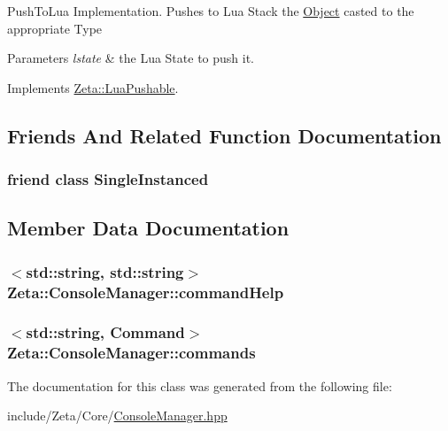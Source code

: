 Push\+To\+Lua Implementation. Pushes to Lua Stack the \hyperlink{classZeta_1_1Object}{Object} casted to the appropriate Type 
\begin{DoxyParams}{Parameters}
{\em lstate} & the Lua State to push it. \\
\hline
\end{DoxyParams}


Implements \hyperlink{classZeta_1_1LuaPushable_a0380ec9cff11f749e8eb67b51b8f82fc}{Zeta\+::\+Lua\+Pushable}.



\subsection{Friends And Related Function Documentation}
\hypertarget{classZeta_1_1ConsoleManager_a2fa95d69b32a77fffa4b730679a8b08c}{
\subsubsection[{Single\+Instanced}]{\setlength{\rightskip}{0pt plus 5cm}friend class {\bf Single\+Instanced}\hspace{0.3cm}{\ttfamily [friend]}}}\label{classZeta_1_1ConsoleManager_a2fa95d69b32a77fffa4b730679a8b08c}


\subsection{Member Data Documentation}
\hypertarget{classZeta_1_1ConsoleManager_a6373f97ce6c358df596d68b1e0420bdb}{
\subsubsection[{command\+Help}]{$<$std\+::string, std\+::string$>$ Zeta\+::\+Console\+Manager\+::command\+Help\hspace{0.3cm}{\ttfamily [private]}}}\label{classZeta_1_1ConsoleManager_a6373f97ce6c358df596d68b1e0420bdb}
\hypertarget{classZeta_1_1ConsoleManager_a6d48909add29aa8abf67a142cde8f84a}{
\subsubsection[{commands}]{$<$std\+::string, {\bf Command}$>$ Zeta\+::\+Console\+Manager\+::commands\hspace{0.3cm}{\ttfamily [private]}}}\label{classZeta_1_1ConsoleManager_a6d48909add29aa8abf67a142cde8f84a}


The documentation for this class was generated from the following file\+:\begin{DoxyCompactItemize}
\item 
include/\+Zeta/\+Core/\hyperlink{ConsoleManager_8hpp}{Console\+Manager.\+hpp}\end{DoxyCompactItemize}
